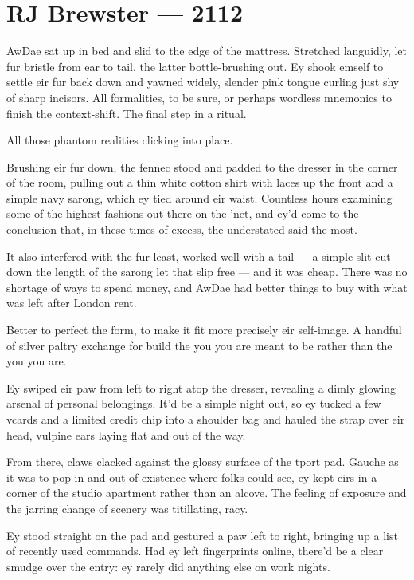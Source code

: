 \hypertarget{rj-brewster-2112}{%
\chapter*{RJ Brewster — 2112}\label{rj-brewster-2112}}

AwDae sat up in bed and slid to the edge of the mattress. Stretched languidly, let fur bristle from ear to tail, the latter bottle-brushing out. Ey shook emself to settle eir fur back down and yawned widely, slender pink tongue curling just shy of sharp incisors. All formalities, to be sure, or perhaps wordless mnemonics to finish the context-shift. The final step in a ritual.

All those phantom realities clicking into place.

Brushing eir fur down, the fennec stood and padded to the dresser in the corner of the room, pulling out a thin white cotton shirt with laces up the front and a simple navy sarong, which ey tied around eir waist. Countless hours examining some of the highest fashions out there on the 'net, and ey'd come to the conclusion that, in these times of excess, the understated said the most.

It also interfered with the fur least, worked well with a tail — a simple slit cut down the length of the sarong let that slip free — and it was cheap. There was no shortage of ways to spend money, and AwDae had better things to buy with what was left after London rent.

Better to perfect the form, to make it fit more precisely eir self-image. A handful of silver paltry exchange for build the you you are meant to be rather than the you you are.

Ey swiped eir paw from left to right atop the dresser, revealing a dimly glowing arsenal of personal belongings. It'd be a simple night out, so ey tucked a few vcards and a limited credit chip into a shoulder bag and hauled the strap over eir head, vulpine ears laying flat and out of the way.

From there, claws clacked against the glossy surface of the tport pad. Gauche as it was to pop in and out of existence where folks could see, ey kept eirs in a corner of the studio apartment rather than an alcove. The feeling of exposure and the jarring change of scenery was titillating, racy.

Ey stood straight on the pad and gestured a paw left to right, bringing up a list of recently used commands. Had ey left fingerprints online, there'd be a clear smudge over the entry: ey rarely did anything else on work nights.

